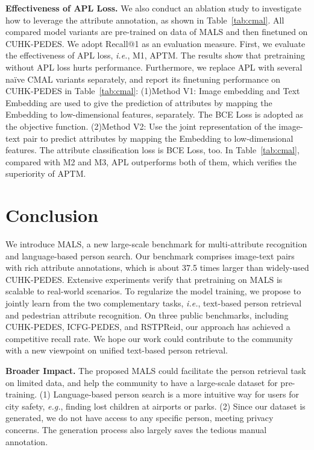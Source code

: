 \documentclass[sigconf]{acmart}
\def\eg{\emph{e.g.}}
\def\ie{\emph{i.e.}}
\begin{document}
\noindent\textbf{Effectiveness of APL Loss.} 
We also conduct an ablation study to investigate how to leverage the attribute annotation, as shown in Table~\ref{tab:cmal}. 
All compared model variants are pre-trained on  data of MALS and then finetuned on CUHK-PEDES.
We adopt Recall@1 as an evaluation measure.
First, we evaluate the effectiveness of APL loss, \ie, M1, APTM. 
The results show that pretraining without APL loss hurts performance.
Furthermore, we replace APL with several naïve CMAL variants separately, and report its finetuning performance on CUHK-PEDES in Table~\ref{tab:cmal}:
(1)Method V1: Image embedding and Text Embedding are used to give the prediction of attributes by mapping the Embedding to low-dimensional features, separately. The BCE Loss is adopted as the objective function.
(2)Method V2: Use the joint representation of the image-text pair to predict attributes by mapping the Embedding to low-dimensional features. The attribute classification loss is BCE Loss, too. 
In Table~\ref{tab:cmal}, compared with M2 and M3, APL
outperforms both of them, which verifies the superiority of APTM.


\section{Conclusion}
We introduce MALS, a new large-scale benchmark for multi-attribute recognition and language-based person search. Our benchmark comprises  image-text pairs with rich attribute annotations, which is about 37.5 times larger than widely-used CUHK-PEDES. Extensive experiments verify that pretraining on MALS is scalable to real-world scenarios. To regularize the model training, we propose to jointly learn from the two complementary tasks, \ie, text-based person retrieval and pedestrian attribute recognition.
On three public benchmarks, including CUHK-PEDES, ICFG-PEDES, and RSTPReid, our approach has achieved a competitive recall rate.
We hope our work could contribute to the community with a new viewpoint on unified text-based person retrieval.  


\noindent\textbf{Broader Impact.}
The proposed MALS could facilitate the person retrieval task on limited data, and help the community to have a large-scale dataset for pre-training. 
(1) Language-based person search is a more intuitive way for users for city safety, \eg, finding lost children at airports or parks.
(2) Since our dataset is generated, we do not have access to any specific person, meeting privacy concerns. The generation process also largely saves the tedious manual annotation. 
\end{document}
